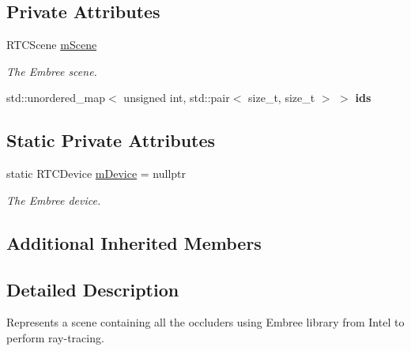 \subsection*{Private Attributes}
\begin{DoxyCompactItemize}
\item 
\mbox{\label{classvisilib_1_1_silhouette_container_embree_af4054861fb6b0bea527689b4cec1d59a}} 
R\+T\+C\+Scene \mbox{\hyperlink{classvisilib_1_1_silhouette_container_embree_af4054861fb6b0bea527689b4cec1d59a}{m\+Scene}}
\begin{DoxyCompactList}\small\item\em The Embree scene. \end{DoxyCompactList}\item 
\mbox{\label{classvisilib_1_1_silhouette_container_embree_a79d334ebeeb331eb3268a0da8cdd006d}} 
std\+::unordered\+\_\+map$<$ unsigned int, std\+::pair$<$ size\+\_\+t, size\+\_\+t $>$ $>$ {\bfseries ids}
\end{DoxyCompactItemize}
\subsection*{Static Private Attributes}
\begin{DoxyCompactItemize}
\item 
\mbox{\label{classvisilib_1_1_silhouette_container_embree_a5be6b858528a5207948fe5bdb9a72072}} 
static R\+T\+C\+Device \mbox{\hyperlink{classvisilib_1_1_silhouette_container_embree_a5be6b858528a5207948fe5bdb9a72072}{m\+Device}} = nullptr
\begin{DoxyCompactList}\small\item\em The Embree device. \end{DoxyCompactList}\end{DoxyCompactItemize}
\subsection*{Additional Inherited Members}


\subsection{Detailed Description}
Represents a scene containing all the occluders using Embree library from Intel to perform ray-\/tracing. 

